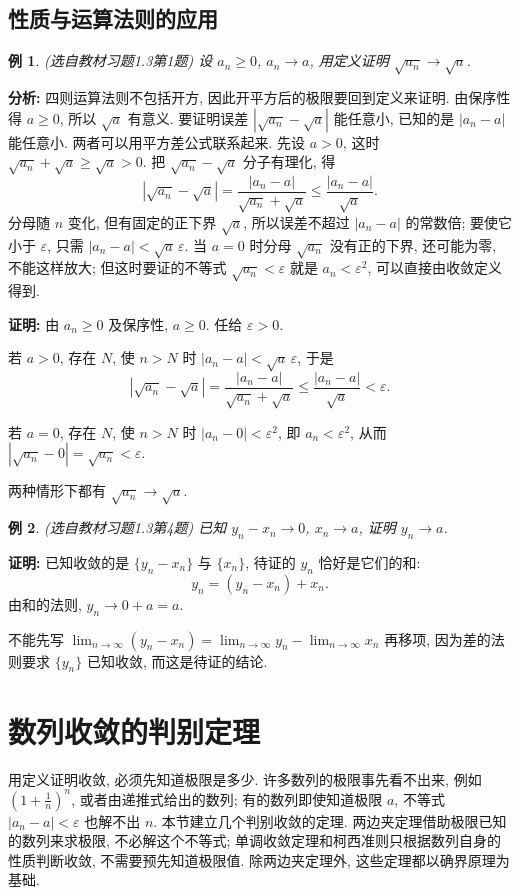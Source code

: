 \documentclass[UTF8,openany]{ctexbook}
\theoremstyle{chinesetextbook}
\newtheorem{example}{例}[section]
\newenvironment{cnproof}{\par\indent\textbf{证明:} \ignorespaces}{\par}
\begin{document}
\subsection{性质与运算法则的应用}
\begin{example}
\textnormal{(选自教材习题1.3第1题)} 设 $a_n\ge0$, $a_n\to a$, 用定义证明 $\sqrt{a_n}\to\sqrt a$.
\end{example}
\par\indent\textbf{分析:} 四则运算法则不包括开方, 因此开平方后的极限要回到定义来证明. 由保序性得 $a\ge0$, 所以 $\sqrt a$ 有意义. 要证明误差 $|\sqrt{a_n}-\sqrt a|$ 能任意小, 已知的是 $|a_n-a|$ 能任意小. 两者可以用平方差公式联系起来. 先设 $a>0$, 这时 $\sqrt{a_n}+\sqrt a\ge\sqrt a>0$. 把 $\sqrt{a_n}-\sqrt a$ 分子有理化, 得
\[
|\sqrt{a_n}-\sqrt a|=\frac{|a_n-a|}{\sqrt{a_n}+\sqrt a}\le\frac{|a_n-a|}{\sqrt a}.
\]
分母随 $n$ 变化, 但有固定的正下界 $\sqrt a$, 所以误差不超过 $|a_n-a|$ 的常数倍; 要使它小于 $\varepsilon$, 只需 $|a_n-a|<\sqrt a\,\varepsilon$. 当 $a=0$ 时分母 $\sqrt{a_n}$ 没有正的下界, 还可能为零, 不能这样放大; 但这时要证的不等式 $\sqrt{a_n}<\varepsilon$ 就是 $a_n<\varepsilon^2$, 可以直接由收敛定义得到.
\begin{cnproof}
由 $a_n\ge0$ 及保序性, $a\ge0$. 任给 $\varepsilon>0$.

若 $a>0$, 存在 $N$, 使 $n>N$ 时 $|a_n-a|<\sqrt a\,\varepsilon$, 于是
\[
|\sqrt{a_n}-\sqrt a|=\frac{|a_n-a|}{\sqrt{a_n}+\sqrt a}\le\frac{|a_n-a|}{\sqrt a}<\varepsilon.
\]

若 $a=0$, 存在 $N$, 使 $n>N$ 时 $|a_n-0|<\varepsilon^2$, 即 $a_n<\varepsilon^2$, 从而 $|\sqrt{a_n}-0|=\sqrt{a_n}<\varepsilon$.

两种情形下都有 $\sqrt{a_n}\to\sqrt a$.
\end{cnproof}
\begin{example}
\textnormal{(选自教材习题1.3第4题)} 已知 $y_n-x_n\to0$, $x_n\to a$, 证明 $y_n\to a$.
\end{example}
\begin{cnproof}
已知收敛的是 $\{y_n-x_n\}$ 与 $\{x_n\}$, 待证的 $y_n$ 恰好是它们的和:
\[
y_n=(y_n-x_n)+x_n.
\]
由和的法则, $y_n\to0+a=a$.
\end{cnproof}
不能先写 $\displaystyle\lim_{n\to\infty}(y_n-x_n)=\lim_{n\to\infty}y_n-\lim_{n\to\infty}x_n$ 再移项, 因为差的法则要求 $\{y_n\}$ 已知收敛, 而这是待证的结论.
\section{数列收敛的判别定理}
用定义证明收敛, 必须先知道极限是多少. 许多数列的极限事先看不出来, 例如 $\displaystyle\left(1+\frac1n\right)^n$, 或者由递推式给出的数列; 有的数列即使知道极限 $a$, 不等式 $|a_n-a|<\varepsilon$ 也解不出 $n$. 本节建立几个判别收敛的定理. 两边夹定理借助极限已知的数列来求极限, 不必解这个不等式; 单调收敛定理和柯西准则只根据数列自身的性质判断收敛, 不需要预先知道极限值. 除两边夹定理外, 这些定理都以确界原理为基础.
\end{document}
